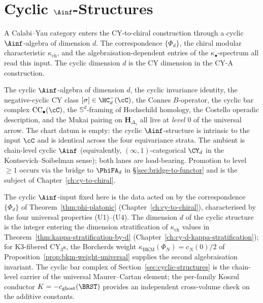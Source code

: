 \chapter{Cyclic \texorpdfstring{$\Ainf$}{A-inf}-Structures}
\label{ch:cyclic-ainf}

A Calabi--Yau category enters the CY-to-chiral construction through a
cyclic $\Ainf$-algebra of dimension $d$. The correspondence
$\{\Phi_d\}$, the chiral modular characteristic
$\kappa_{\mathrm{ch}}$, and the algebraisation-dependent entries of
the $\kappa_\bullet$-spectrum all read this input. The cyclic dimension
$d$ is the CY dimension in the CY-A construction.

\begin{remark}
\label{rem:cyclic-ainf-three-axis-scope}
The cyclic $\Ainf$-algebra of dimension $d$, the cyclic invariance
identity, the negative-cyclic CY class $[\sigma] \in \HC^-_d(\cC)$,
the Connes $B$-operator, the cyclic bar complex
$\mathrm{CC}_\bullet(\cC)$, the $\mathbb S^d$-framing of Hochschild
homology, the Costello operadic description, and the Mukai pairing on
$\mathbf H_{\Delta_5}$ all live at \emph{level $0$} of the universal
arrow. The chart datum is empty: the cyclic $\Ainf$-structure is
intrinsic to the input $\cC$ and is identical across the four
equivariance strata. The ambient is chain-level cyclic $\Ainf$
(equivalently, $(\infty,1)$-categorical $\CY_d$ in the Kontsevich--Soibelman
sense); both lanes are load-bearing. Promotion to level $\geq 1$
occurs via the bridge to $\PhiFA_d$ in
\S\ref{sec:bridge-to-functor} and is the subject of
Chapter~\ref{ch:cy-to-chiral}.
\end{remark}

\begin{remark}
\label{rem:cyclic-ainf-cross-deps}
The cyclic $\Ainf$-input fixed here is the data acted on by the
correspondence $\{\Phi_d\}$ of Theorem~\textup{\ref{thm:phi-platonic}}
(Chapter~\textup{\ref{ch:cy-to-chiral}}), characterised by the four
universal properties \textup{(U1)}--\textup{(U4)}. The dimension $d$ of
the cyclic structure is the integer entering the dimension
stratification of $\kappa_{\mathrm{ch}}$ values in
Theorem~\textup{\ref{thm:kappa-stratification-by-d}}
(Chapter~\textup{\ref{ch:cy-d-kappa-stratification}}); for
K3-fibered CY$_3$s, the Borcherds weight
$\kappa_{\mathrm{BKM}}(\Phi_N) = c_N(0)/2$ of
Proposition~\textup{\ref{prop:bkm-weight-universal}} supplies the
second algebraisation invariant. The cyclic bar complex of
Section~\textup{\ref{sec:cyclic-structures}} is the chain-level
carrier of the universal Maurer--Cartan element; the per-family Koszul
conductor $K = -c_{\mathrm{ghost}}(\BRST)$ provides an independent
cross-volume check on the additive constants.
\end{remark}

